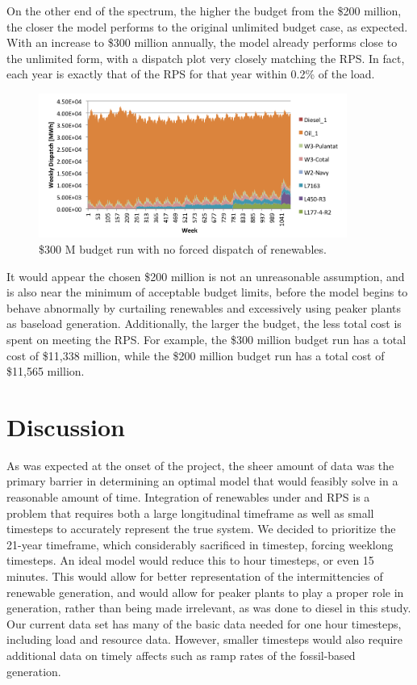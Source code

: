 \documentclass[12pt,letterpaper,fleqn]{article}
\begin{document}
On the other end of the spectrum, the higher the budget from the \$200
million, the closer the model performs to the original unlimited
budget case, as expected. With an increase to \$300 million annually,
the model already performs close to the unlimited form, with a
dispatch plot very closely matching the RPS. In fact, each year is
exactly that of the RPS for that year within 0.2\% of the load.

\begin{figure}[!h]
  \centering
  \includegraphics[width=0.9\textwidth]{img/budget_300_not_forced}
  \caption{\$300 M budget run with no forced dispatch of renewables.}
  \label{fig:budget_300_not_forced}
\end{figure}

It would appear the chosen \$200 million is not an unreasonable 
assumption, and is also near the minimum of acceptable budget limits,
before the model begins to behave abnormally by curtailing renewables
and excessively using peaker plants as baseload
generation. Additionally, the larger the budget, the less total cost
is spent on meeting the RPS. For example, the \$300 million budget run
has a total cost of \$11,338 million, while the \$200 million budget
run has a total cost of \$11,565 million.

\section{Discussion}

As was expected at the onset of the project, the sheer amount of data
was the primary barrier in determining an optimal model that would
feasibly solve in a reasonable amount of time. Integration of
renewables under and RPS is a problem that requires both a large
longitudinal timeframe as well as small timesteps to accurately
represent the true system. We decided to prioritize the 21-year
timeframe, which considerably sacrificed in timestep, forcing weeklong
timesteps. An ideal model would reduce this to hour timesteps, or even
15 minutes. This would allow for better representation of the intermittencies 
of renewable generation, and would allow for peaker plants to play a proper
role in generation, rather than being made irrelevant, as was done to diesel
in this study. Our current data set has many of the basic data needed for
one hour timesteps, including load and resource data. However, smaller
timesteps would also require additional data on timely affects such as
ramp rates of the fossil-based generation. 
\end{document}
